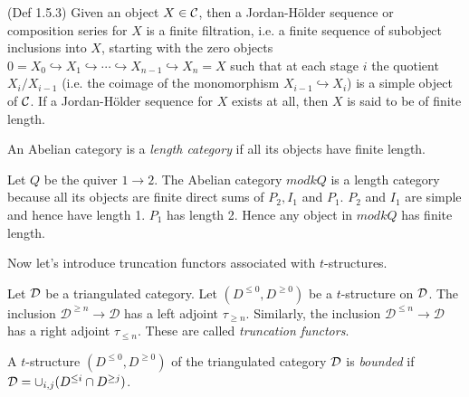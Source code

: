 \begin{definition}
\cite{EGNO}(Def 1.5.3) Given an object $X\in\mathcal{C}$, then a Jordan-H\"older sequence or composition series for $X$ is a finite filtration, i.e. a finite sequence of subobject inclusions into $X$, starting with the zero objects $0=X_0\hookrightarrow X_1\hookrightarrow\cdots\hookrightarrow X_{n-1}\hookrightarrow X_n=X$ such that at each stage $i$ the quotient $X_i/X_{i-1}$ (i.e. the coimage of the monomorphism $X_{i-1}\hookrightarrow X_i$) is a simple object of $\mathcal{C}$. If a Jordan-H\"older sequence for $X$ exists at all, then $X$ is said to be of finite length.
\end{definition}
\begin{definition}
An Abelian category is a \textit{length category} if all its objects have finite length.
\end{definition}
\begin{example}
Let $Q$ be the quiver $1\to 2$. The Abelian category $mod kQ$ is a length category because all its objects are finite direct sums of $P_2, I_1$ and $P_1$. $P_2$ and $I_1$ are simple and hence have length 1. $P_1$ has length 2. Hence any object in $mod kQ$ has finite length.
\end{example}
\indent Now let's introduce truncation functors associated with $t$-structures. 
\begin{lemma}
\cite{BBD}  Let $\mathcal{D}$ be a triangulated category. Let $(D^{\leq 0},D^{\geq 0})$ be a $t$-structure on $\mathcal{D}$. The inclusion ${\mathcal{D}^{\geq n} \rightarrow \mathcal{D}}$ has a left adjoint ${\tau_{\geq n}}$. Similarly, the inclusion ${\mathcal{D}^{\leq n} \rightarrow \mathcal{D}}$ has a right adjoint ${\tau_{\leq n}}$. These are called \textit{truncation functors}.
\end{lemma}
\begin{definition}
\cite{B07} A $t$-structure $(D^{\leq 0},D^{\geq 0})$ of the triangulated category $\mathcal{D}$ is \textit{bounded} if $\mathcal{D} = \cup_{i,j} (D^{\leq i}\cap D^{\geq j})$.
\end{definition}
